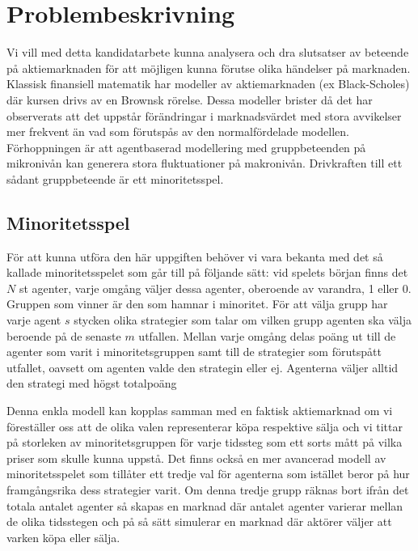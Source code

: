 \section{Problembeskrivning}


Vi vill med detta kandidatarbete kunna analysera och dra slutsatser av beteende på aktiemarknaden för att möjligen kunna förutse olika händelser på marknaden. Klassisk finansiell matematik har modeller av aktiemarknaden (ex Black-Scholes) där kursen drivs av en Brownsk rörelse. Dessa modeller brister då det har observerats att det uppstår förändringar i marknadsvärdet med stora avvikelser mer frekvent än vad som förutspås av den normalfördelade modellen. Förhoppningen är att agentbaserad modellering med gruppbeteenden på mikronivån kan generera stora fluktuationer på makronivån. Drivkraften till ett sådant gruppbeteende är ett minoritetsspel.

\subsection{Minoritetsspel}
För att kunna utföra den här uppgiften behöver vi vara bekanta med det så kallade minoritetsspelet som går till på följande sätt: vid spelets början finns det $N$ st agenter, varje omgång väljer dessa agenter, oberoende av varandra, 1 eller 0. Gruppen som vinner är den som hamnar i minoritet. För att välja grupp har varje agent $s$ stycken olika strategier som talar om vilken grupp agenten ska välja beroende på de senaste $m$ utfallen. Mellan varje omgång delas poäng ut till de agenter som varit i minoritetsgruppen samt till de strategier som förutspått utfallet, oavsett om agenten valde den strategin eller ej. Agenterna väljer alltid den strategi med högst totalpoäng 

Denna enkla modell kan kopplas samman med en faktisk aktiemarknad om vi föreställer oss att de olika valen representerar köpa respektive sälja och vi tittar på storleken av minoritetsgruppen för varje tidssteg som ett sorts mått på vilka priser som skulle kunna uppstå. Det finns också en mer avancerad modell av minoritetsspelet som tillåter ett tredje val för agenterna som istället beror på hur framgångsrika dess strategier varit. Om denna tredje grupp räknas bort ifrån det totala antalet agenter så skapas en marknad där antalet agenter varierar mellan de olika tidsstegen och på så sätt simulerar en marknad där aktörer väljer att varken köpa eller sälja. 

